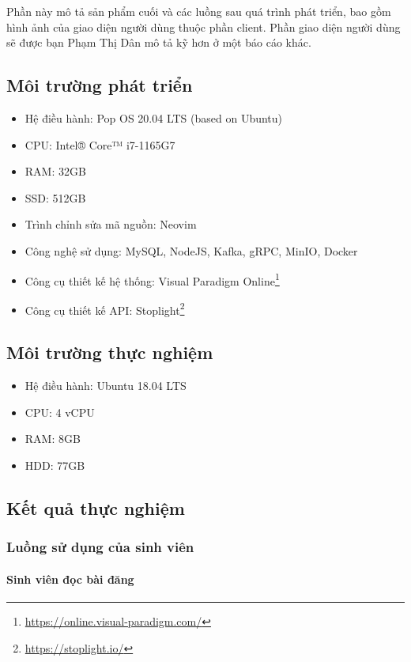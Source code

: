 \documentclass[./../main.tex]{subfiles}
\begin{document}
Phần này mô tả sản phẩm cuối và các luồng sau quá trình phát triển, bao gồm hình ảnh của giao diện người dùng thuộc phần client. Phần giao diện người dùng sẽ được bạn Phạm Thị Dân mô tả kỹ hơn ở một báo cáo khác.

\subsection{Môi trường phát triển}

\begin{itemize}
	\item Hệ điều hành: Pop OS 20.04 LTS (based on Ubuntu)
	\item CPU: Intel® Core™ i7-1165G7
	\item RAM: 32GB
	\item SSD: 512GB
	\item Trình chỉnh sửa mã nguồn: Neovim
	\item Công nghệ sử dụng: MySQL, NodeJS, Kafka, gRPC, MinIO, Docker
	\item Công cụ thiết kế hệ thống: Visual Paradigm Online\footnote{\url{https://online.visual-paradigm.com/}}
	\item Công cụ thiết kế API: Stoplight\footnote{\url{https://stoplight.io/}}
\end{itemize}

\subsection{Môi trường thực nghiệm}

\begin{itemize}
	\item Hệ điều hành: Ubuntu 18.04 LTS
	\item CPU: 4 vCPU
	\item RAM: 8GB
	\item HDD: 77GB
\end{itemize}

\subsection{Kết quả thực nghiệm}

\subsubsection{Luồng sử dụng của sinh viên}

\paragraph*{Sinh viên đọc bài đăng}
\end{document}
